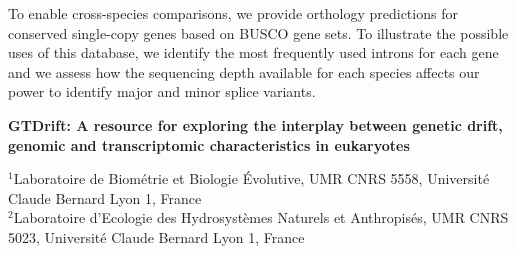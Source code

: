     To enable cross-species comparisons, we provide orthology predictions for conserved single-copy genes based on \acrshort{BUSCO} gene sets.
    To illustrate the possible uses of this database, we identify the most frequently used introns for each gene and we assess how the sequencing depth available for each species affects our power to identify major and minor splice variants.

    \newpage
    
    \vspace*{10pt}
    
    \begin{center}
    \Large{\textbf{GTDrift: A resource for exploring the interplay between genetic drift, genomic and transcriptomic characteristics in eukaryotes}} \\
    \end{center}
    
    \begin{flushleft}
    
    \small
    \begin{center}
    $^{1}$Laboratoire de Biométrie et Biologie Évolutive, UMR CNRS 5558, Université Claude Bernard Lyon 1, France\\
    $^{2}$Laboratoire d'Ecologie des Hydrosystèmes Naturels et Anthropisés, UMR CNRS 5023, Université Claude Bernard Lyon 1, France\\
    \end{center}
    \end{flushleft}
    
    {\hypersetup{linkcolor=GREYDARK}\minitoc\newpage}
    
\graphicspath{{chap5-GTDrift/figures/}}

